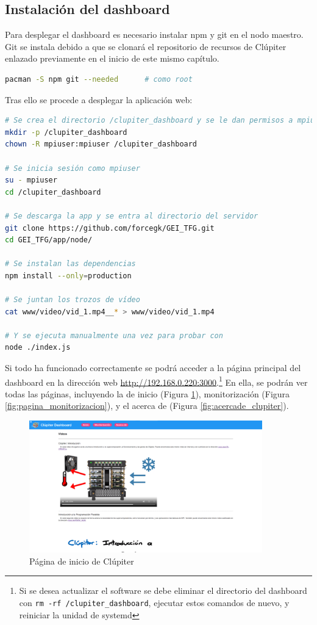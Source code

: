 \subsection{Instalación del dashboard}
Para desplegar el dashboard es necesario instalar npm y git en el nodo maestro. Git se instala debido a que se clonará el repositorio de recursos de Clúpiter enlazado previamente en el inicio de este mismo capítulo.
\begin{lstlisting}[language=bash]
pacman -S npm git --needed      # como root
\end{lstlisting}

Tras ello se procede a desplegar la aplicación web:
\begin{lstlisting}[language=bash]
# Se crea el directorio /clupiter_dashboard y se le dan permisos a mpiuser
mkdir -p /clupiter_dashboard
chown -R mpiuser:mpiuser /clupiter_dashboard

# Se inicia sesión como mpiuser
su - mpiuser
cd /clupiter_dashboard

# Se descarga la app y se entra al directorio del servidor
git clone https://github.com/forcegk/GEI_TFG.git
cd GEI_TFG/app/node/

# Se instalan las dependencias
npm install --only=production

# Se juntan los trozos de vídeo
cat www/video/vid_1.mp4__* > www/video/vid_1.mp4

# Y se ejecuta manualmente una vez para probar con
node ./index.js
\end{lstlisting}

Si todo ha funcionado correctamente se podrá acceder a la página principal del dashboard en la dirección web \url{http://192.168.0.220:3000}.\footnote{Si se desea actualizar el software se debe eliminar el directorio del dashboard con \texttt{rm -rf /clupiter\_dashboard}, ejecutar estos comandos de nuevo, y reiniciar la unidad de systemd} En ella, se podrán ver todas las páginas, incluyendo la de inicio (Figura \ref{fig:inicio_clupiter}), monitorización (Figura \ref{fig:pagina_monitorizacion}), y el acerca de (Figura \ref{fig:acercade_clupiter}).

\begin{figure}[h!]
  \centering
  \includegraphics[width=0.9\textwidth]{img/dashboard/inicio.png}
  \caption{Página de inicio de Clúpiter}
  \label{fig:inicio_clupiter}
\end{figure}


